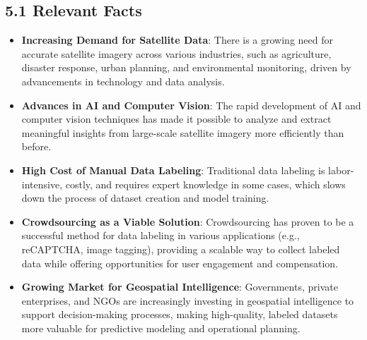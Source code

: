 \documentclass[12pt]{article}
\begin{document}
\subsection*{5.1 Relevant Facts}
\begin{itemize}[leftmargin=2cm]
    \item \textbf{Increasing Demand for Satellite Data}: There is a growing need for accurate satellite imagery across various industries, such as agriculture, disaster response, urban planning, and environmental monitoring, driven by advancements in technology and data analysis.
    \item \textbf{Advances in AI and Computer Vision}: The rapid development of AI and computer vision techniques has made it possible to analyze and extract meaningful insights from large-scale satellite imagery more efficiently than before.
    \item \textbf{High Cost of Manual Data Labeling}: Traditional data labeling is labor-intensive, costly, and requires expert knowledge in some cases, which slows down the process of dataset creation and model training.
    \item \textbf{Crowdsourcing as a Viable Solution}: Crowdsourcing has proven to be a successful method for data labeling in various applications (e.g., reCAPTCHA, image tagging), providing a scalable way to collect labeled data while offering opportunities for user engagement and compensation.
    \item \textbf{Growing Market for Geospatial Intelligence}: Governments, private enterprises, and NGOs are increasingly investing in geospatial intelligence to support decision-making processes, making high-quality, labeled datasets more valuable for predictive modeling and operational planning.
\end{itemize}
\end{document}
